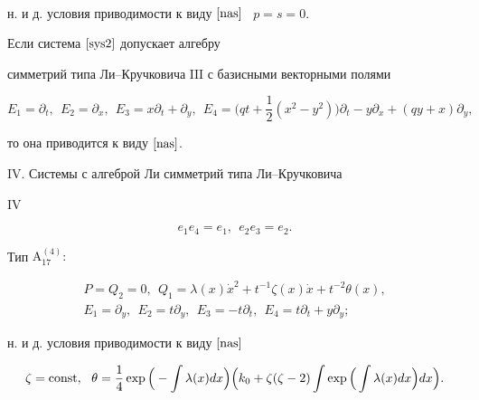 \begin{thms}
\begin{gather*}
\end{gather*}


н. и д. условия приводимости к виду $\eqref{nas}$ \ $p=s=0$.





Если система $\eqref{sys2}$ допускает алгебру


симметрий типа Ли--Кручковича $\mathrm{III}$ с базисными векторными полями


$$


E_1=\partial_t,\ \ E_2=\partial_x,\ \ E_3=x\partial_t+\partial_y,


\ \ E_4=\bigg(qt+\frac12(x^2-y^2)\bigg)\partial_t-y\partial_x+(qy+x)\partial_y,


$$


то она приводится к виду $\eqref{nas}$.





$\mathrm{IV}$. Системы с алгеброй Ли симметрий типа Ли--Кручковича


$\mathrm{IV}$


$$


e_1e_4=e_1,\ \ e_2e_3=e_2.


$$





Тип $\mathrm{A^{(4)}_{17}}{:}$


\begin{gather*}


P= Q_2=0, \ \ Q_1=


\lambda(x)\Dot x^2+t^{-1}\zeta(x)\Dot x+t^{-2}\theta(x),\\


E_1=\partial_y,\ \ E_2=t\partial_ y,


\ \ E_3=-t\partial_t,\ \ E_4=t\partial_t+y\partial_y;


\end{gather*}


н. и д. условия приводимости к виду $\eqref{nas}$


$$


\zeta=\const,\ \ { \theta}=\frac {1}{4}


\exp\Big(-\int\lambda (x)dx\Big)\Big(k_0+\zeta


(\zeta-2)\int\exp\Big(


\int \lambda ( x)d x\Big)d x \Big).


$$






\end{thms}
